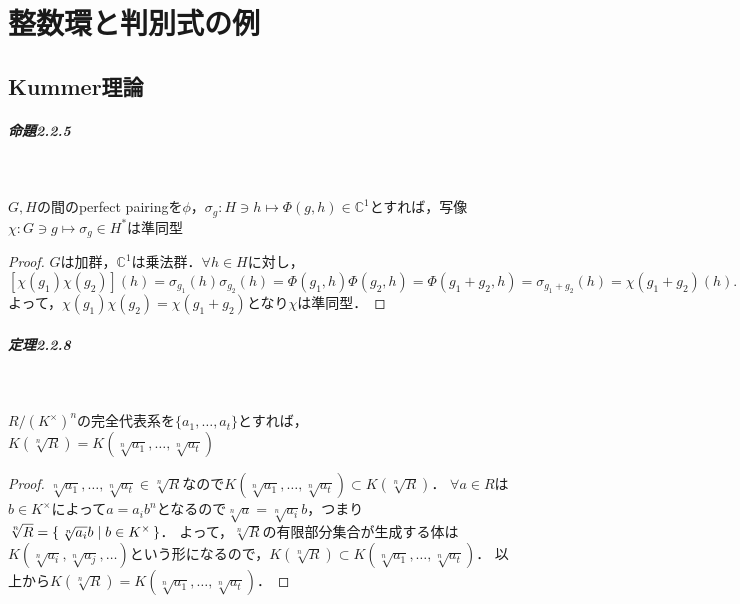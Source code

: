 \chapter{整数環と判別式の例}
\setcounter{section}{1}
\section{Kummer理論}
\paragraph{命題2.2.5}~
\begin{screen}
  $G, H$の間のperfect pairingを$\phi$，$\sigma_g\colon H\ni h\mapsto\Phi(g, h)\in\mathbb{C}^1$とすれば，写像$\chi\colon G\ni g\mapsto\sigma_g\in H^\ast$は準同型
\end{screen}
\begin{proof}
  $G$は加群，$\mathbb{C}^1$は乗法群．$\forall h\in H$に対し，
  \[\left[\chi(g_1)\chi(g_2)\right](h)=\sigma_{g_1}(h)\sigma_{g_2}(h)=\Phi(g_1, h)\Phi(g_2, h)=\Phi(g_1+g_2, h)=\sigma_{g_1+g_2}(h)=\chi(g_1+g_2)(h).\]
  よって，$\chi(g_1)\chi(g_2)=\chi(g_1+g_2)$となり$\chi$は準同型．
\end{proof}

\paragraph{定理2.2.8}~
\begin{screen}
  $R/(K^\times)^n$の完全代表系を$\{a_1, \ldots, a_t\}$とすれば，$K(\sqrt[n]{R})=K(\sqrt[n]{a_1}, \ldots, \sqrt[n]{a_t})$
\end{screen}
\begin{proof}
  $\sqrt[n]{a_1}, \ldots, \sqrt[n]{a_t}\in\sqrt[n]{R}$なので$K(\sqrt[n]{a_1}, \ldots, \sqrt[n]{a_t})\subset K(\sqrt[n]{R})$．
  $\forall a\in R$は$b\in K^\times$によって$a=a_ib^n$となるので$\sqrt[n]{a}=\sqrt[n]{a_i}b$，つまり$\sqrt[n]{R}=\set{\sqrt[n]{a_i}b | b\in K^\times}$．
  よって，$\sqrt[n]{R}$の有限部分集合が生成する体は$K(\sqrt[n]{a_i}, \sqrt[n]{a_j}, \ldots)$という形になるので，$K(\sqrt[n]{R})\subset K(\sqrt[n]{a_1}, \ldots, \sqrt[n]{a_t})$．
  以上から$K(\sqrt[n]{R})=K(\sqrt[n]{a_1}, \ldots, \sqrt[n]{a_t})$．
\end{proof}

